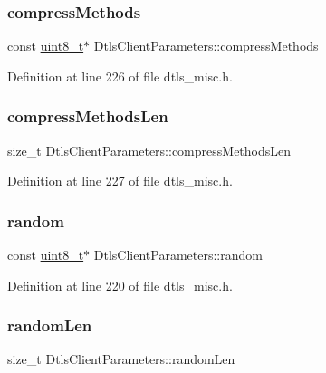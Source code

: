\subsubsection{\texorpdfstring{compress\+Methods}{compressMethods}}
{\footnotesize\ttfamily const \hyperlink{stdint_8h_aba7bc1797add20fe3efdf37ced1182c5}{uint8\+\_\+t}$\ast$ Dtls\+Client\+Parameters\+::compress\+Methods}



Definition at line 226 of file dtls\+\_\+misc.\+h.

\mbox{\label{structDtlsClientParameters_a0910d54a373e1c9b1dbfe47cc45458d6}} 
\subsubsection{\texorpdfstring{compress\+Methods\+Len}{compressMethodsLen}}
{\footnotesize\ttfamily size\+\_\+t Dtls\+Client\+Parameters\+::compress\+Methods\+Len}



Definition at line 227 of file dtls\+\_\+misc.\+h.

\mbox{\label{structDtlsClientParameters_af465b2ea577f66ff4ebf3b83e5c0b854}} 
\subsubsection{\texorpdfstring{random}{random}}
{\footnotesize\ttfamily const \hyperlink{stdint_8h_aba7bc1797add20fe3efdf37ced1182c5}{uint8\+\_\+t}$\ast$ Dtls\+Client\+Parameters\+::random}



Definition at line 220 of file dtls\+\_\+misc.\+h.

\mbox{\label{structDtlsClientParameters_a08ff7ceea84f110d641bc30a7adcdd9e}} 
\subsubsection{\texorpdfstring{random\+Len}{randomLen}}
{\footnotesize\ttfamily size\+\_\+t Dtls\+Client\+Parameters\+::random\+Len}



